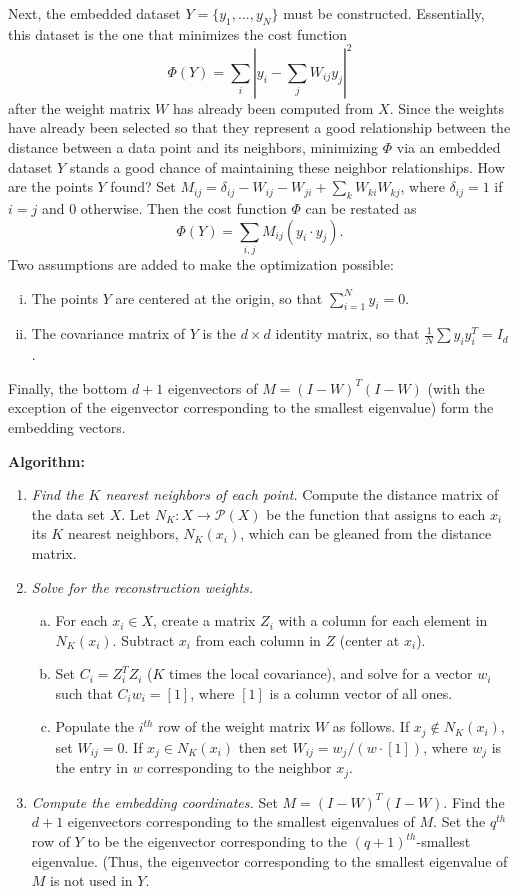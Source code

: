 \documentclass{gtpart}
\theoremstyle{definition}
\begin{document}
Next, the embedded dataset $Y = \{y_1, ..., y_N\}$ must be constructed. Essentially, this dataset is the one that minimizes the cost function $$\Phi(Y) = \sum_i \left| y_i - \sum_j W_{ij} y_j \right|^2$$ after the weight matrix $W$  has already been computed from $X$. Since the weights have already been selected so that they represent a good relationship between the distance between a data point and its neighbors, minimizing $\Phi$ via an embedded dataset $Y$ stands a good chance of maintaining these neighbor relationships. How are the points $Y$ found? Set $M_{ij} = \delta_{ij} - W_{ij} - W_{ji} + \sum_k W_{ki}W_{kj}$, where $\delta_{ij} =1$ if $i=j$ and 0 otherwise. Then the cost function $\Phi$ can be restated as $$\Phi(Y) = \sum_{i,j} M_{ij}(y_i \cdot y_j).$$ Two assumptions are added to make the optimization possible:
\begin{enumerate}[(i)]
\item The points $Y$ are centered at the origin, so that $\sum_{i=1}^N y_i = 0$.
\item The covariance matrix of $Y$ is the $d \times d$ identity matrix, so that $\frac{1}{N} \sum y_i y_i^T = I_d$.
\end{enumerate}
Finally, the bottom $d+1$ eigenvectors of $M = (I - W)^T(I - W)$ (with the exception of the eigenvector corresponding to the smallest eigenvalue) form the embedding vectors. 

{\bf Algorithm:}
\begin{enumerate}[1.]
\item {\it Find the $K$ nearest neighbors of each point.} Compute the distance matrix of the data set $X$. Let $N_K:X \rightarrow \mathscr{P}(X)$ be the function that assigns to each $x_i$ its $K$ nearest neighbors, $N_K(x_i)$, which can be gleaned from the distance matrix.
\item {\it Solve for the reconstruction weights.} 
	\begin{enumerate}[(a)]
	\item For each $x_i \in X$, create a matrix $Z_i$ with a column for each element in $N_K(x_i)$. Subtract $x_i$ from each column in $Z$ (center at $x_i$). 
	\item Set $C_i = Z_i^T Z_i$ ($K$ times the local covariance), and solve for a vector $w_i$ such that $C_i w_i = [1]$, where $[1]$ is a column vector of all ones. 
	\item Populate the $i^{th}$ row of the weight matrix $W$ as follows. If $x_j \notin N_K(x_i)$, set $W_{ij} = 0$. If $x_j \in N_K(x_i)$ then set $W_{ij} = w_j/(w \cdot [1])$, where $w_j$ is the entry in $w$ corresponding to the neighbor $x_j$.
	\end{enumerate}
\item {\it Compute the embedding coordinates.} Set $M = (I - W)^T(I - W)$. Find the $d + 1$ eigenvectors corresponding to the smallest eigenvalues of $M$. Set the $q^{th}$ row of $Y$ to be the eigenvector corresponding to the $(q+1)^{th}$-smallest eigenvalue. (Thus, the eigenvector corresponding to the smallest eigenvalue of $M$ is not used in $Y$.
\end{enumerate}
\end{document}
